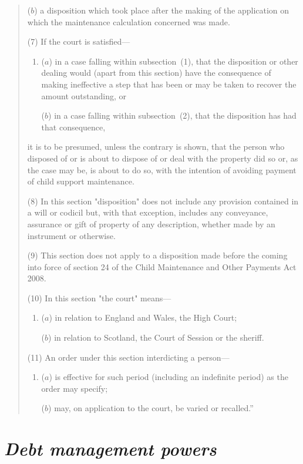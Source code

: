 \documentclass[12pt,a4paper]{article}
\begin{document}
\begin{quotation}
\begin{enumerate}
($b$) a disposition which took place after the making of the application on which the maintenance calculation concerned was made.
\end{enumerate}

(7) If the court is satisfied---
\begin{enumerate}\item[]
($a$) in a case falling within subsection~(1), that the disposition or other dealing would (apart from this section) have the consequence of making ineffective a step that has been or may be taken to recover the amount outstanding, or

($b$) in a case falling within subsection~(2), that the disposition has had that consequence,
\end{enumerate}
it is to be presumed, unless the contrary is shown, that the person who disposed of or is about to dispose of or deal with the property did so or, as the case may be, is about to do so, with the intention of avoiding payment of child support maintenance.

(8)
In this section "disposition" does not include any provision contained in a will or codicil but, with that exception, includes any conveyance, assurance or gift of property of any description, whether made by an instrument or otherwise.

(9)
This section does not apply to a disposition made before the coming into force of section 24 of the Child Maintenance and Other Payments Act 2008.

(10)
In this section "the court" means---
\begin{enumerate}\item[]
($a$) in relation to England and Wales, the High Court;

($b$) in relation to Scotland, the Court of Session or the sheriff.
\end{enumerate}

(11) An order under this section interdicting a person---
\begin{enumerate}\item[]
($a$) is effective for such period (including an indefinite period) as the order may specify;

($b$) may, on application to the court, be varied or recalled.''
\end{enumerate}
\end{quotation}


\section{\itshape Debt management powers}
\end{document}
